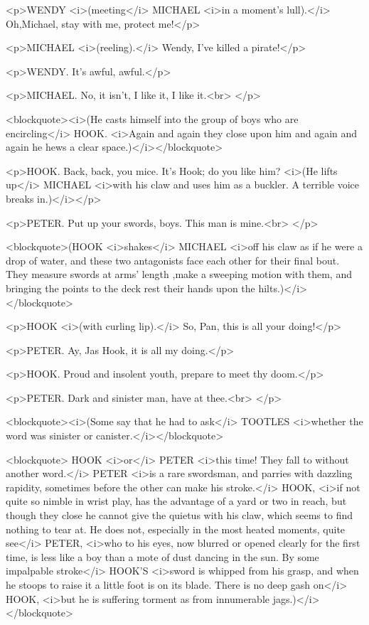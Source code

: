 <p>WENDY <i>(meeting</i> MICHAEL <i>in a moment's lull).</i>
Oh,Michael, stay with me, protect me!</p>

<p>MICHAEL <i>(reeling).</i> Wendy, I've killed a pirate!</p>

<p>WENDY. It's awful, awful.</p>

<p>MICHAEL. No, it isn't, I like it, I like it.<br>
</p>

<blockquote><i>(He casts himself into the group of boys who are
encircling</i> HOOK. <i>Again and again they close upon him and again
and again he hews a clear space.)</i></blockquote>

<p>HOOK. Back, back, you mice. It's Hook; do you like him? <i>(He
lifts up</i> MICHAEL <i>with his claw and uses him as a buckler. A
terrible voice breaks in.)</i></p>

<p>PETER. Put up your swords, boys. This man is mine.<br>
</p>

<blockquote>(HOOK <i>shakes</i> MICHAEL <i>off his claw as if he were
a drop of water, and these two antagonists face each other for their
final bout. They measure swords at arms' length ,make a sweeping
motion with them, and bringing the points to the deck rest their
hands upon the hilts.)</i></blockquote>

<p>HOOK <i>(with curling lip).</i> So, Pan, this is all your
doing!</p>

<p>PETER. Ay, Jas Hook, it is all my doing.</p>

<p>HOOK. Proud and insolent youth, prepare to meet thy doom.</p>

<p>PETER. Dark and sinister man, have at thee.<br>
</p>

<blockquote><i>(Some say that he had to ask</i> TOOTLES <i>whether
the word was sinister or canister.</i></blockquote>

<blockquote>   HOOK <i>or</i> PETER <i>this time! They fall to
without another word.</i> PETER <i>is a rare swordsman, and parries
with dazzling rapidity, sometimes before the other can make his
stroke.</i> HOOK, <i>if not quite so nimble in wrist play, has the
advantage of a yard or two in reach, but though they close he cannot
give the quietus with his claw, which seems to find nothing to tear
at. He does not, especially in the most heated moments, quite see</i>
PETER, <i>who to his eyes, now blurred or opened clearly for the
first time, is less like a boy than a mote of dust dancing in the
sun. By some impalpable stroke</i> HOOK'S <i>sword is whipped from
his grasp, and when he stoops to raise it a little foot is on its
blade. There is no deep gash on</i> HOOK, <i>but he is suffering
torment as from innumerable jags.)</i></blockquote>

